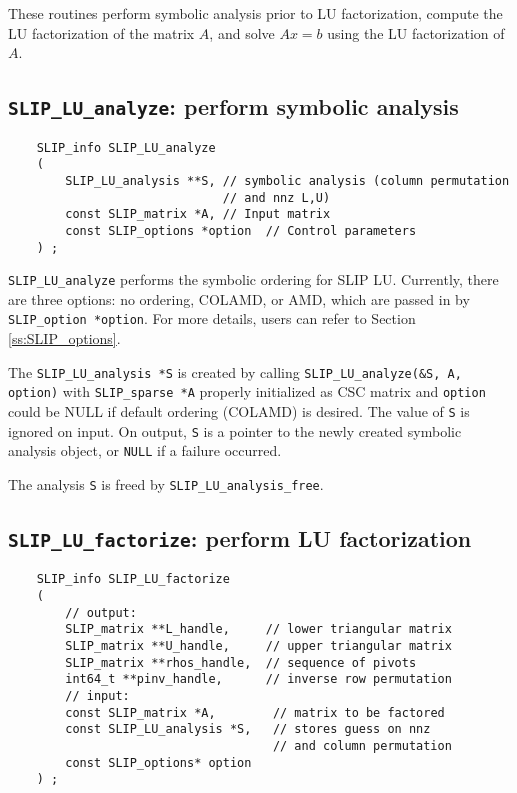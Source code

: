 \documentclass[12pt]{article}
\theoremstyle{definition}
\begin{document}
These routines perform symbolic analysis prior to LU factorization, compute the
LU factorization of the matrix $A$, and solve $Ax=b$ using the LU factorization
of $A$.

\cprotect\subsection{\verb|SLIP_LU_analyze|: perform symbolic analysis}
\label{s:SLIP_LU_analyze}

\begin{mdframed}[userdefinedwidth=6in]
{\footnotesize
\begin{verbatim}
    SLIP_info SLIP_LU_analyze
    (
        SLIP_LU_analysis **S, // symbolic analysis (column permutation
                              // and nnz L,U)
        const SLIP_matrix *A, // Input matrix
        const SLIP_options *option  // Control parameters
    ) ;
\end{verbatim}
} \end{mdframed}

\verb|SLIP_LU_analyze| performs the symbolic ordering for SLIP LU. Currently,
there are three options: no ordering, COLAMD, or AMD, which are passed
in by \verb|SLIP_option *option|. For more details, users can refer to Section
\ref{ss:SLIP_options}.

The \verb|SLIP_LU_analysis *S| is created by calling
\verb|SLIP_LU_analyze(&S, A, option)| with \verb|SLIP_sparse *A| properly
initialized as CSC matrix and \verb|option| could be NULL if default ordering
(COLAMD) is desired. The value of \verb|S| is ignored on input.  On output,
\verb|S| is a pointer to the newly created symbolic analysis object, or
\verb|NULL| if a failure occurred.

The analysis \verb|S| is freed by \verb|SLIP_LU_analysis_free|.

\cprotect\subsection{\verb|SLIP_LU_factorize|: perform LU factorization}
\label{ss:SLIP_LU_factorize}

\begin{mdframed}[userdefinedwidth=6in]
{\footnotesize
\begin{verbatim}
    SLIP_info SLIP_LU_factorize
    (
        // output:
        SLIP_matrix **L_handle,     // lower triangular matrix
        SLIP_matrix **U_handle,     // upper triangular matrix
        SLIP_matrix **rhos_handle,  // sequence of pivots
        int64_t **pinv_handle,      // inverse row permutation
        // input:
        const SLIP_matrix *A,        // matrix to be factored
        const SLIP_LU_analysis *S,   // stores guess on nnz
                                     // and column permutation
        const SLIP_options* option
    ) ;
\end{verbatim}
} \end{mdframed}
\end{document}
